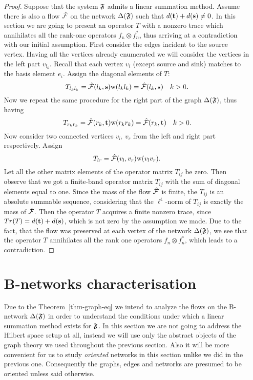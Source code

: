 \documentclass[12pt]{amsart}
\begin{document}
\begin{proof}
      Suppose that the system $\mathfrak{F}$ admits a linear summation method.
      Assume there is also a flow $\mathcal{\hat{F}}$ on the network $\Delta(\mathfrak{F})$ such that $d(\mathbf{t}) + d(\mathbf{s}) \neq 0$.
      In this section we are going to present an operator $T$ with a nonzero trace which annihilates all the rank-one
      operators $f_n \otimes f^*_n$, thus arriving at a contradiction with our initial assumption.
      First consider the edges incident to the source vertex.
      Having all the vertices already enumerated we will consider the vertices in the left part $v_{l_k}$.
      Recall that each vertex $v_i$ (except source and sink) matches to the basis element $e_i$.
      Assign the diagonal elements of $T$:
      \[
        T_{l_k l_k} = \mathcal{\hat{F}}(l_k, \mathbf{s}) \mathrm{w}(l_k l_k) = \mathcal{\hat{F}}(l_k, \mathbf{s}) \quad k > 0.
      \]
      Now we repeat the same procedure for the right part of the graph $\Delta(\mathfrak{F})$, thus having
      \[
        T_{r_k r_k} = \mathcal{\hat{F}}(r_k, \mathbf{t}) \mathrm{w}(r_k r_k) = \mathcal{\hat{F}}(r_k, \mathbf{t}) \quad k > 0.
      \]
      Now consider two connected vertices $v_l$, $v_r$ from the left and right part
        respectively. Assign
      \[
        T_{lr} = \mathcal{\hat{F}}(v_l, v_r) \mathrm{w}(v_l  v_r).
      \]
      Let all the other matrix elements of the operator matrix $T_{ij}$ be zero.
      Then observe that we got a finite-band operator matrix $T_{ij}$ with the sum of diagonal elements
      equal to one.
      Since the mass of the flow $\mathcal{\hat{F}}$ is finite, the $T_{ij}$ is an absolute summable sequence, considering that
        the $\ell^1$-norm of $T_{ij}$ is exactly the mass of $\mathcal{\hat{F}}$.
      Then the operator $T$ acquires a finite nonzero trace, since $Tr(T) = d(\mathbf{t}) + d(\mathbf{s})$, which is not zero
        by the assumption we made.
      Due to the fact, that the flow was preserved at each vertex of the network $\Delta(\mathfrak{F})$,
        we see that the operator $T$ annihilates all the rank one operators $f_n \otimes f^*_n$,
        which leads to a contradiction.
    \end{proof}

  \section{B-networks characterisation}
    Due to the Theorem~\ref{thm-graph-eq} we intend to analyze the flows on the B-network
      $\Delta(\mathfrak{F})$ in order to understand the conditions under which a linear
      summation method exists for $\mathfrak{F}$.
    In this section we are not going to address the Hilbert space setup at all,
      instead we will use only the abstract objects of the graph theory
      we used throughout the previous section.
    Also it will be more convenient for us to study \emph{oriented} networks in this section unlike we
      did in the previous one.
    Consequently the graphs, edges and networks are presumed to be oriented unless said otherwise.
\end{document}

